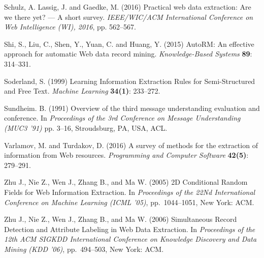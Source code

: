 \documentclass{nle}
\begin{document}
\begin{thebibliography}{}
Schulz, A. Lassig, J. and Gaedke, M. (2016)
Practical web data extraction: Are we there yet? --- A short survey.
{\it IEEE/WIC/ACM International Conference on Web Intelligence (WI), 2016}, 
pp. 562--567.

Shi, S., Liu, C., Shen, Y., Yuan, C. and Huang, Y. (2015)
AutoRM: An effective approach for automatic Web data record mining.
{\it Knowledge-Based Systems}
{\bf 89}: 314--331.

Soderland, S. (1999)
Learning Information Extraction Rules for Semi-Structured and Free Text.
{\it Machine Learning} 
{\bf 34(1)}: 233--272.

Sundheim. B. (1991)
Overview of the third message understanding evaluation and conference.
In {\it Proceedings of the 3rd Conference on Message Understanding (MUC3 '91)}
pp. 3--16, Stroudsburg, PA, USA, ACL.

Varlamov, M. and Turdakov, D. (2016)
A survey of methods for the extraction of information from Web resources.
{\it Programming and Computer Software}
{\bf 42(5)}: 279--291.

Zhu J., Nie Z., Wen J., Zhang B., and Ma W. (2005)
2D Conditional Random Fields for Web Information Extraction.
In {\it Proceedings of the 22Nd International Conference on Machine Learning (ICML '05)}, 
pp.~1044--1051, New York: ACM.

Zhu J., Nie Z., Wen J., Zhang B., and Ma W. (2006)
Simultaneous Record Detection and Attribute Labeling in Web Data Extraction.
In {\it Proceedings of the 12th ACM SIGKDD International Conference on Knowledge Discovery and Data Mining (KDD '06)}, 
pp.~494--503, New York: ACM.

\end{thebibliography}
\end{document}

